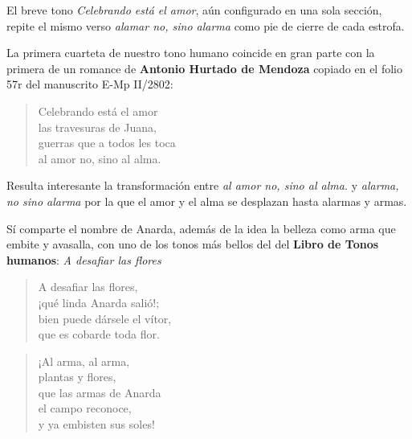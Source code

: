 El breve tono \textit{Celebrando está el amor}, aún configurado en una sola sección, repite el mismo verso \textit{alamar no, sino alarma} como pie de cierre de cada estrofa.

La primera cuarteta de nuestro tono humano coincide en gran parte con la primera de un romance de \textbf{Antonio Hurtado de Mendoza} copiado en el folio 57r del manuscrito E-Mp II/2802:

\begin{verse}
Celebrando está el amor \\
las travesuras de Juana, \\
guerras que a todos les toca\\
al amor no, sino al alma.\\
\end{verse}

Resulta interesante la transformación entre \textit{al amor no, sino al alma.} y \textit{alarma, no sino alarma} por la que el amor y el alma se desplazan hasta alarmas y armas. 

Sí comparte el nombre de Anarda, además de la idea la belleza como arma que embite y avasalla, con uno de los tonos más bellos del del \textbf{Libro de Tonos humanos}:  \textit{A desafiar las flores}

\begin{verse}
A desafiar las flores, \\
¡qué linda Anarda salió!; \\
bien puede dársele el vítor, \\
que es cobarde toda flor.
\end{verse}

\begin{verse}
¡Al arma, al arma,\\
plantas y flores,\\
que las armas de Anarda\\
el campo reconoce,\\
y ya embisten sus soles!
\end{verse}

